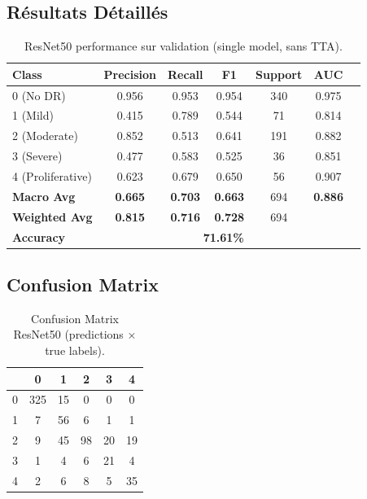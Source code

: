 \documentclass[12pt,a4paper,oneside]{report}
\begin{document}
\subsection{Résultats Détaillés}

\begin{table}[H]
\centering
\begin{tabular}{|l|c|c|c|c|c|c|}
\hline
\textbf{Class} & \textbf{Precision} & \textbf{Recall} & 
\textbf{F1} & \textbf{Support} & \textbf{AUC} \\
\hline
0 (No DR) & 0.956 & 0.953 & 0.954 & 340 & 0.975 \\
1 (Mild) & 0.415 & 0.789 & 0.544 & 71 & 0.814 \\
2 (Moderate) & 0.852 & 0.513 & 0.641 & 191 & 0.882 \\
3 (Severe) & 0.477 & 0.583 & 0.525 & 36 & 0.851 \\
4 (Proliferative) & 0.623 & 0.679 & 0.650 & 56 & 0.907 \\
\hline
\textbf{Macro Avg} & \textbf{0.665} & \textbf{0.703} & \textbf{0.663} & 
694 & \textbf{0.886} \\
\textbf{Weighted Avg} & \textbf{0.815} & \textbf{0.716} & \textbf{0.728} 
& 694 & \\
\hline
\textbf{Accuracy} & \multicolumn{5}{c|}{\textbf{71.61\%}} \\
\hline
\end{tabular}
\caption{ResNet50 performance sur validation (single model, sans TTA).}
\label{tab:resnet_performance}
\end{table}

\subsection{Confusion Matrix}

\begin{table}[H]
\centering
\begin{tabular}{c|ccccc}
& 0 & 1 & 2 & 3 & 4 \\
\hline
0 & 325 & 15 & 0 & 0 & 0 \\
1 & 7 & 56 & 6 & 1 & 1 \\
2 & 9 & 45 & 98 & 20 & 19 \\
3 & 1 & 4 & 6 & 21 & 4 \\
4 & 2 & 6 & 8 & 5 & 35 \\
\hline
\end{tabular}
\caption{Confusion Matrix ResNet50 (predictions × true labels).}
\label{tab:resnet_cm}
\end{table}
\end{document}
